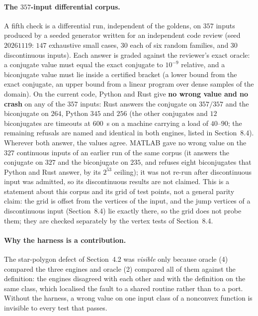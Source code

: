 \documentclass[11pt]{article}
\theoremstyle{definition}
\begin{document}
\paragraph{The $357$-input differential corpus.}
A fifth check is a differential run, independent of the goldens, on $357$ inputs
produced by a seeded generator written for an independent code review (seed
$20261119$: $147$ exhaustive small cases, $30$ each of six random families, and
$30$ discontinuous inputs). Each answer is graded against the reviewer's exact
oracle: a conjugate value must equal the exact conjugate to $10^{-9}$
relative, and a biconjugate value must lie inside a certified bracket (a lower
bound from the exact conjugate, an upper bound from a linear program over dense
samples of the domain). On the current code, Python and Rust give \textbf{no wrong value
and no crash} on any of the $357$ inputs: Rust answers the conjugate on
$357/357$ and the biconjugate on $264$, Python $345$ and $256$ (the other
conjugates and $12$ biconjugates are timeouts at $600$~s on a machine
carrying a load of $40$--$90$; the remaining refusals are named and identical in
both engines, listed in Section~8.4). Wherever both answer, the values agree.
MATLAB gave no wrong value on the $327$ continuous inputs of an earlier run of
the same corpus (it answers the conjugate on $327$ and the biconjugate on $235$,
and refuses eight biconjugates that Python and Rust answer, by its $2^{53}$
ceiling); it was not re-run after discontinuous input was admitted, so its
discontinuous results are not claimed. This is a statement about this corpus
and its grid of test points, not a general parity claim: the grid is offset from
the vertices of the input, and the jump vertices of a
discontinuous input (Section~8.4) lie exactly there, so the grid does not probe them;
they are checked separately by the vertex tests of Section~8.4.

\paragraph{Why the harness is a contribution.}
The star-polygon defect of Section~4.2 was \emph{visible} only because oracle
(4) compared the three engines and oracle (2) compared all of them against the
definition: the engines disagreed with each other and with the definition on
the same class, which localised the fault to a shared routine rather than to a
port.
 Without the harness, a wrong value
on one input class of a nonconvex function is invisible to every test that
passes.
\end{document}

